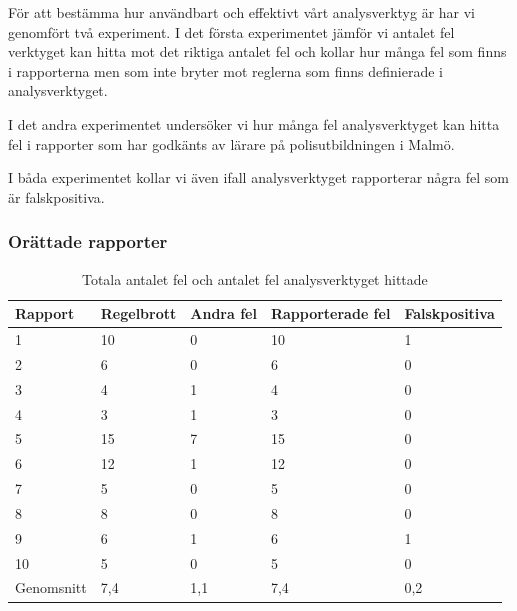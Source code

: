 \documentclass[swedish]{maucsthesis}
\begin{document}
För att bestämma hur användbart och effektivt vårt analysverktyg är har vi genomfört två experiment.
I det första experimentet jämför vi antalet fel verktyget kan hitta mot det riktiga
antalet fel och kollar hur många fel som finns i rapporterna men som inte bryter mot
reglerna som finns definierade i analysverktyget. 

I det andra experimentet undersöker vi hur många fel analysverktyget kan hitta fel i rapporter
som har godkänts av lärare på polisutbildningen i Malmö.

I båda experimentet kollar vi även ifall analysverktyget rapporterar några fel som är
falskpositiva.

\subsubsection{Orättade rapporter}

\begin{table}[H]
\centering
\begin{tabular}{|l|l|l|l|l|}
\hline
Rapport    & Regelbrott & Andra fel & Rapporterade fel & Falskpositiva \\ \hline
1          & 10         & 0         & 10               & 1             \\ \hline
2          & 6          & 0         & 6                & 0             \\ \hline
3          & 4          & 1         & 4                & 0             \\ \hline
4          & 3          & 1         & 3                & 0             \\ \hline
5          & 15         & 7         & 15               & 0             \\ \hline
6          & 12         & 1         & 12               & 0             \\ \hline
7          & 5          & 0         & 5                & 0             \\ \hline
8          & 8          & 0         & 8                & 0             \\ \hline
9          & 6          & 1         & 6                & 1             \\ \hline
10         & 5          & 0         & 5                & 0             \\ \hline
Genomsnitt & 7,4        & 1,1       & 7,4              & 0,2           \\ \hline
\end{tabular}
\caption{Totala antalet fel och antalet fel analysverktyget hittade}
\label{ungradedtable}
\end{table}
\end{document}
